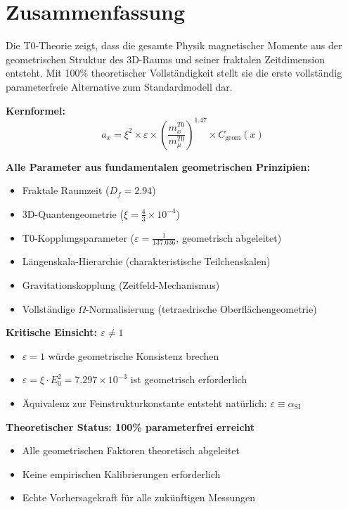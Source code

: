 \documentclass[12pt,a4paper]{article}
\numberwithin{equation}{section}
\newcommand{\xipar}{\xi}
\newcommand{\epsilonT}{\varepsilon}
\newcommand{\alphaSI}{\alpha_{\text{SI}}}
\newcommand{\Cgeom}{C_{\text{geom}}}
\newcommand{\Df}{D_f}
\newcommand{\Eo}{E_0}
\newcommand{\Omegafactor}{\Omega}
\begin{document}
	\section{Zusammenfassung}
	
	Die T0-Theorie zeigt, dass die gesamte Physik magnetischer Momente aus der geometrischen Struktur des 3D-Raums und seiner fraktalen Zeitdimension entsteht. Mit 100\% theoretischer Vollständigkeit stellt sie die erste vollständig parameterfreie Alternative zum Standardmodell dar.
	
	\textbf{Kernformel:}
	\begin{equation}
		a_x = \xipar^2 \times \epsilonT \times \left(\frac{m_x^{T0}}{m_\mu^{T0}}\right)^{1.47} \times \Cgeom(x)
		\label{eq:core_formula}
	\end{equation}
	
	\textbf{Alle Parameter aus fundamentalen geometrischen Prinzipien:}
	\begin{itemize}
		\item Fraktale Raumzeit ($\Df = 2.94$)
		\item 3D-Quantengeometrie ($\xipar = \frac{4}{3} \times 10^{-4}$)
		\item T0-Kopplungsparameter ($\epsilonT = \frac{1}{137.036}$, geometrisch abgeleitet)
		\item Längenskala-Hierarchie (charakteristische Teilchenskalen)
		\item Gravitationskopplung (Zeitfeld-Mechanismus)
		\item Vollständige $\Omegafactor$-Normalisierung (tetraedrische Oberflächengeometrie)
	\end{itemize}
	
	\textbf{Kritische Einsicht: $\epsilonT \neq 1$}
	\begin{itemize}
		\item $\epsilonT = 1$ würde geometrische Konsistenz brechen
		\item $\epsilonT = \xipar \cdot \Eo^2 = 7.297 \times 10^{-3}$ ist geometrisch erforderlich
		\item Äquivalenz zur Feinstrukturkonstante entsteht natürlich: $\epsilonT \equiv \alphaSI$
	\end{itemize}
	
	\textbf{Theoretischer Status: 100\% parameterfrei erreicht}
	\begin{itemize}
		\item Alle geometrischen Faktoren theoretisch abgeleitet
		\item Keine empirischen Kalibrierungen erforderlich
		\item Echte Vorhersagekraft für alle zukünftigen Messungen
	\end{itemize}
	
\end{document}
